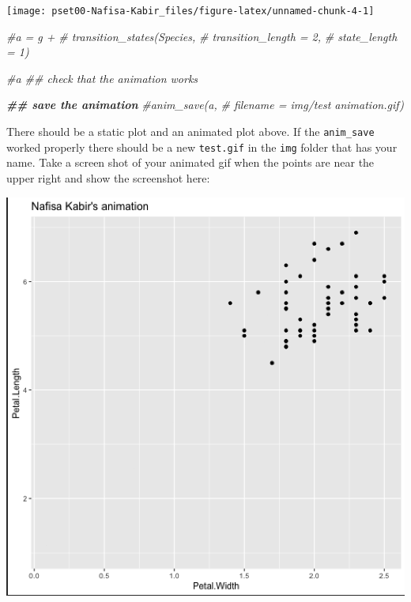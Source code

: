 \documentclass[
]{article}
\newenvironment{Shaded}{\begin{snugshade}}{\end{snugshade}}
\newcommand{\CommentTok}[1]{\textcolor[rgb]{0.56,0.35,0.01}{\textit{#1}}}
\newcommand{\DocumentationTok}[1]{\textcolor[rgb]{0.56,0.35,0.01}{\textbf{\textit{#1}}}}
\begin{document}
\begin{center}\texttt{[image: pset00-Nafisa-Kabir\_files/figure-latex/unnamed-chunk-4-1]} \end{center}

\begin{Shaded}
\begin{Highlighting}[]
\CommentTok{\#a = g + }
 \CommentTok{\# transition\_states(Species,}
               \CommentTok{\#     transition\_length = 2,}
               \CommentTok{\#     state\_length = 1)}

\CommentTok{\#a  \#\# check that the animation works}

\DocumentationTok{\#\# save the animation}
\CommentTok{\#anim\_save(a, }
      \CommentTok{\#    filename = \textquotesingle{}img/test animation.gif\textquotesingle{})}
\end{Highlighting}
\end{Shaded}

There should be a static plot and an animated plot above. If the
\texttt{anim\_save} worked properly there should be a new
\texttt{test.gif} in the \texttt{img} folder that has your name. Take a
screen shot of your animated gif when the points are near the upper
right and show the screenshot here:

\includegraphics{img/snip of test animation.png}
\end{document}
